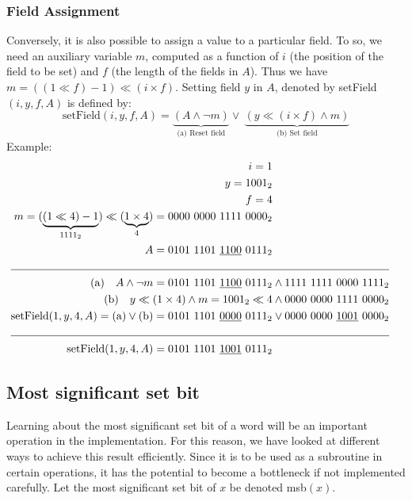 \subsubsection{Field Assignment}

Conversely, it is also possible to assign a value to a particular field. To so, we need an auxiliary variable $m$, computed as a function of $i$ (the position of the field to be set) and $f$ (the length of the fields in $A$). Thus we have $m = ((1 \ll f) - 1) \ll (i \times f)$. Setting field $y$ in $A$, denoted by setField$(i, y, f, A)$ is defined by:
\begin{equation*}
    \text{setField}(i, y, f, A) = \underbrace{(A \wedge \neg m)}_{\text{(a) Reset field}} \vee \ \underbrace{(y \ll (i \times f) \wedge m)}_{\text{(b) Set field}}
\end{equation*}
Example:
\begin{align*}
    i = 1\\
    y = 1001_2\\
    f = 4\\
    m = (\underbrace{(1 \ll 4)  - 1} _{1111_2}) \ll (\underbrace{1 \times 4}_{4}) = 0000\ 0000\ 1111\ 0000_2\\
    A = 0101\ 1101\ \underline{1100}\ 0111_2& \\
    \cline{1-2}
    \text{(a)}\quad A \wedge \neg m = 0101\ 1101\ \underline{1100}\ 0111_2 & \wedge 1111\ 1111\ 0000\ 1111_2\\
    \text{(b)}\quad y \ll (1 \times 4) \wedge m = 1001_2 \ll 4 & \wedge 0000\ 0000\ 1111\ 0000_2\\
    \text{setField}(1, y, 4, A) = \text{(a)} \vee \text{(b)} = 0101\ 1101\ \underline{0000}\ 0111_2& \vee 0000\ 0000\ \underline{1001}\ 0000_2 \\
    \cline{1-2}
    \text{setField}(1, y, 4, A) = 0101\ 1101\ \underline{1001}\ 0111_2&
\end{align*}

\subsection{Most significant set bit}

Learning about the most significant set bit of a word will be an important operation in the implementation. For this reason, we have looked at different ways to achieve this result efficiently. Since it is to be used as a subroutine in certain operations, it has the potential to become a bottleneck if not implemented carefully. Let the most significant set bit of $x$ be denoted msb$(x)$.

